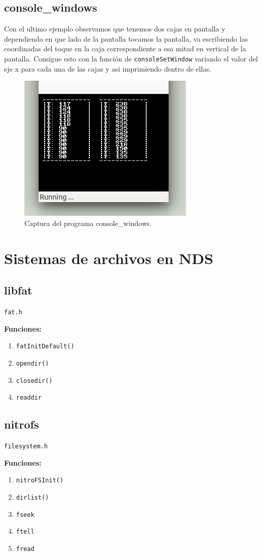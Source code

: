 \documentclass[12pt,english]{article}
\begin{document}
    
    \subsection{console\_windows}

    Con el ultimo ejemplo observamos que tenemos dos cajas en pantalla y dependiendo en que lado de la pantalla tocamos la pantalla, va escribiendo las coordinadas del toque en la caja correspondiente a esa mitad en vertical de la pantalla. Consigue esto con la función de \texttt{consoleSetWindow} variando el valor del eje x para cada una de las cajas y asi imprimiendo dentro de ellas.

    \begin{figure}[H] 
    \centering
    \includegraphics[scale=0.5]{p3Media/console_windows}
    \caption{Captura del programa console\_windows.}
    \end{figure}

    \newpage

    \section{Sistemas de archivos en NDS}

    \subsection{libfat}

    \texttt{fat.h}

    \textbf{Funciones:}
    \begin{enumerate}
        \item \texttt{fatInitDefault()}
        \item \texttt{opendir()}
        \item \texttt{closedir()}
        \item \texttt{readdir}
    \end{enumerate}

    \subsection{nitrofs}
      
    \texttt{filesystem.h}

    \textbf{Funciones:}
    \begin{enumerate}
        \item \texttt{nitroFSInit()}
        \item \texttt{dirlist()}
        \item \texttt{fseek}
        \item \texttt{ftell}
        \item \texttt{fread}
    \end{enumerate}


    
    
\end{document}
